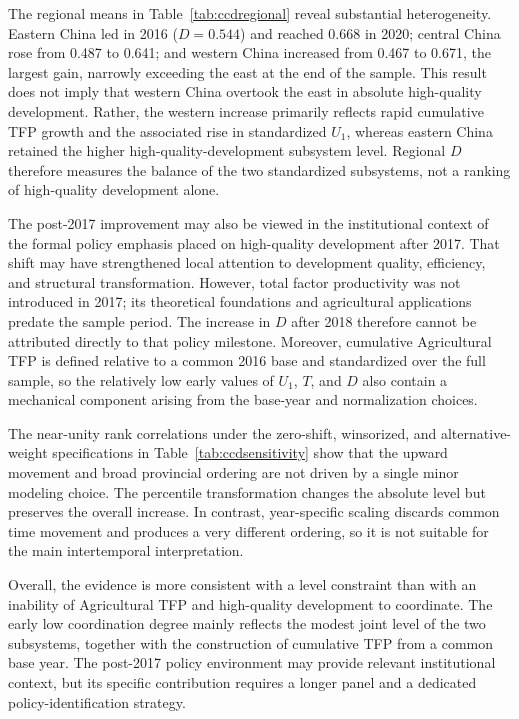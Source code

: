 \documentclass[sustainability,article,submit,moreauthors]{Definitions/mdpi}
\numberwithin{equation}{section}
\begin{document}
The regional means in Table~\ref{tab:ccdregional} reveal substantial
heterogeneity. Eastern China led in 2016 ($D=0.544$) and reached 0.668 in 2020;
central China rose from 0.487 to 0.641; and western China increased from 0.467
to 0.671, the largest gain, narrowly exceeding the east at the end of the
sample. This result does not imply that western China overtook the east in
absolute high-quality development. Rather, the western increase primarily
reflects rapid cumulative TFP growth and the associated rise in standardized
$U_1$, whereas eastern China retained the higher high-quality-development
subsystem level. Regional $D$ therefore measures the balance of the two
standardized subsystems, not a ranking of high-quality development alone.

The post-2017 improvement may also be viewed in the institutional context of
the formal policy emphasis placed on high-quality development after 2017. That
shift may have strengthened local attention to development quality, efficiency,
and structural transformation. However, total factor productivity was not
introduced in 2017; its theoretical foundations and agricultural applications
predate the sample period. The increase in $D$ after 2018 therefore cannot be
attributed directly to that policy milestone. Moreover, cumulative Agricultural
TFP is defined relative to a common 2016 base and standardized over the full
sample, so the relatively low early values of $U_1$, $T$, and $D$ also contain a
mechanical component arising from the base-year and normalization choices.

The near-unity rank correlations under the zero-shift, winsorized, and
alternative-weight specifications in Table~\ref{tab:ccdsensitivity} show that
the upward movement and broad provincial ordering are not driven by a single
minor modeling choice. The percentile transformation changes the absolute
level but preserves the overall increase. In contrast, year-specific scaling
discards common time movement and produces a very different ordering, so it is
not suitable for the main intertemporal interpretation.

Overall, the evidence is more consistent with a level constraint than with an
inability of Agricultural TFP and high-quality development to coordinate. The
early low coordination degree mainly reflects the modest joint level of the two
subsystems, together with the construction of cumulative TFP from a common base
year. The post-2017 policy environment may provide relevant institutional
context, but its specific contribution requires a longer panel and a dedicated
policy-identification strategy.
\end{document}
